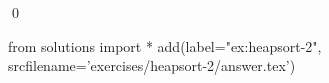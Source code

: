 
\begin{ex} 
  \label{ex:heapsort-2}
  
  \qed
\end{ex} 
\begin{python0}
from solutions import *
add(label="ex:heapsort-2",
    srcfilename='exercises/heapsort-2/answer.tex') 
\end{python0}
